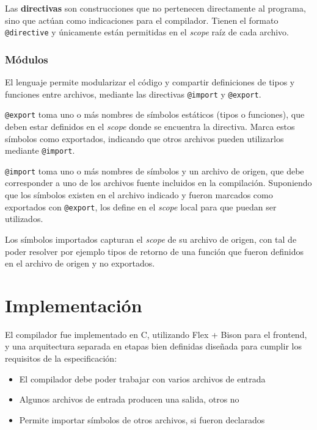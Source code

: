 Las \textbf{directivas} son construcciones que no pertenecen directamente al programa, sino que actúan como indicaciones para el compilador. Tienen el formato \texttt{@directive} y únicamente están permitidas en el \textit{scope} raíz de cada archivo.

\subsubsection{Módulos}

El lenguaje permite modularizar el código y compartir definiciones de tipos y funciones entre archivos, mediante las directivas \texttt{@import} y \texttt{@export}.

\texttt{@export} toma uno o más nombres de símbolos estáticos (tipos o funciones), que deben estar definidos en el \textit{scope} donde se encuentra la directiva. Marca estos símbolos como exportados, indicando que otros archivos pueden utilizarlos mediante \texttt{@import}.

\texttt{@import} toma uno o más nombres de símbolos y un archivo de origen, que debe corresponder a uno de los archivos fuente incluidos en la compilación. Suponiendo que los símbolos existen en el archivo indicado y fueron marcados como exportados con \texttt{@export}, los define en el \textit{scope} local para que puedan ser utilizados.

Los símbolos importados capturan el \textit{scope} de su archivo de origen, con tal de poder resolver por ejemplo tipos de retorno de una función que fueron definidos en el archivo de origen y no exportados.

\section{Implementación}

El compilador fue implementado en C, utilizando Flex + Bison para el frontend, y una arquitectura separada en etapas bien definidas diseñada para cumplir los requisitos de la especificación:

\begin{itemize}
	\item El compilador debe poder trabajar con varios archivos de entrada
	\item Algunos archivos de entrada producen una salida, otros no
	\item Permite importar símbolos de otros archivos, si fueron declarados
\end{itemize}

